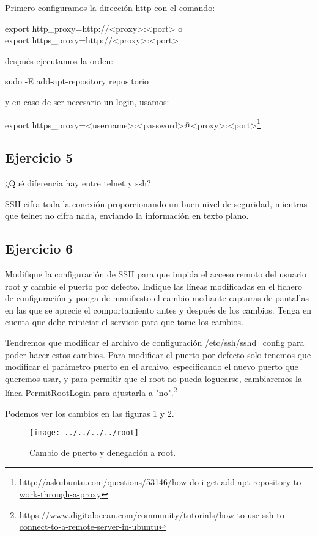 \documentclass[a4paper, 11pt]{article} %
\begin{document}
Primero configuramos la dirección http con el comando: 

export http\_proxy=http://<proxy>:<port>   o \\
export https\_proxy=http://<proxy>:<port>

después ejecutamos la orden: 

sudo -E add-apt-repository repositorio

y en caso de ser necesario un login, usamos: 

export https\_proxy=<username>:<password>@<proxy>:<port>\footnote{\url{http://askubuntu.com/questions/53146/how-do-i-get-add-apt-repository-to-work-through-a-proxy}}

\subsection{Ejercicio 5}
¿Qué diferencia hay entre telnet y ssh?

SSH cifra toda la conexión proporcionando un buen nivel de seguridad, mientras que telnet no cifra nada, enviando la información en texto plano.


\subsection{Ejercicio 6}
Modifique la configuración de SSH para que impida el acceso remoto del usuario root y cambie el puerto por defecto. Indique las líneas modificadas en el fichero de configuración y ponga de manifiesto el cambio mediante capturas de pantallas en las que se aprecie el comportamiento antes y después de los cambios. Tenga en cuenta que debe reiniciar el servicio para que tome los cambios.

Tendremos que modificar el archivo de configuración /etc/ssh/sshd\_config para poder hacer estos cambios. Para modificar el puerto por defecto solo tenemos que modificar el parámetro puerto en el archivo, especificando el nuevo puerto que queremos usar, y para permitir que el root no pueda loguearse, cambiaremos la línea PermitRootLogin para ajustarla a "no".\footnote{\url{https://www.digitalocean.com/community/tutorials/how-to-use-ssh-to-connect-to-a-remote-server-in-ubuntu}}

Podemos ver los cambios en las figuras 1 y 2. 

\pagebreak

\begin{figure}[htpb]
\texttt{[image: ../../../../root]}
\caption{Cambio de puerto y denegación a root.}
\end{figure}
\end{document}
